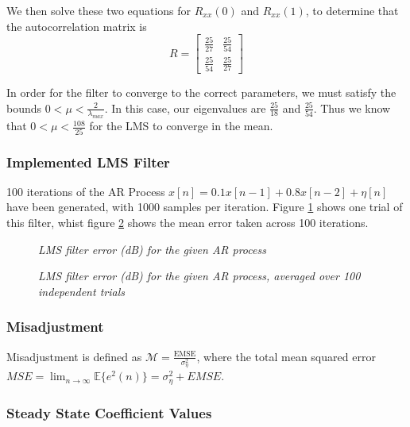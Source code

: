 \documentclass[./main.tex]{subfiles}
\begin{document}
We then solve these two equations for $ R_{xx}(0) $ and $ R_{xx}(1) $, to determine that the autocorrelation matrix is 
$$ R = \begin{bmatrix}
\frac{25}{27} & \frac{25}{54} \\[0.3em]
 \frac{25}{54} & \frac{25}{27}
\end{bmatrix}
$$

In order for the filter to converge to the correct parameters, we must satisfy the bounds $ 0 < \mu < \frac{2}{\lambda_{max}} $. In this case, our eigenvalues are $\frac{25}{18}$ and $\frac{25}{54}$. Thus we know that $ 0 < \mu < \frac{108}{25} $ for the LMS to converge in the mean.

\subsubsection{Implemented LMS Filter}
100 iterations of the AR Process $ x[n] = 0.1 x[n-1] + 0.8 x[n-2] + \eta[n] $ have been generated, with 1000 samples per iteration. Figure \ref{fig:q3_1_b_indiv} shows one trial of this filter, whist figure \ref{fig:q3_1_b} shows the mean error taken across 100 iterations.

\begin{figure}[h]
	\centering 
 	\resizebox{\textwidth}{!}{}
   	\caption{\textit{LMS filter error (dB) for the given AR process}}
   	\label{fig:q3_1_b_indiv}
\end{figure}


\begin{figure}[h]
	\centering 
 	\resizebox{\textwidth}{!}{}
   	\caption{\textit{LMS filter error (dB) for the given AR process, averaged over 100 independent trials}}
   	\label{fig:q3_1_b}
\end{figure}


\subsubsection{Misadjustment}

Misadjustment is defined as $ \mathcal{M} = \frac{\mathrm{EMSE}}{\sigma^2_\eta}$, where the total mean squared error $ MSE = \lim_{n \to \infty} \mathbb{E} \{ e^2 (n) \} = \sigma^2_\eta + EMSE $. 

\subsubsection{Steady State Coefficient Values}
\end{document}
